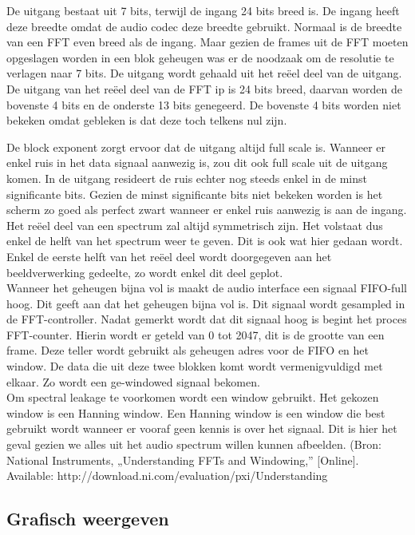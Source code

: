 \documentclass[a4paper,kul]{kulakarticle} %
\begin{document}
De uitgang bestaat uit 7 bits, terwijl de ingang 24 bits breed is. De ingang heeft deze breedte omdat de audio codec deze breedte gebruikt. Normaal is de breedte van een FFT even breed als de ingang. Maar gezien de frames uit de FFT moeten opgeslagen worden in een blok geheugen was er de noodzaak om de resolutie te verlagen naar 7 bits. De uitgang wordt gehaald uit het reëel deel van de uitgang. De uitgang van het reëel deel van de FFT ip is 24 bits breed, daarvan worden de bovenste 4 bits en de onderste 13 bits genegeerd. De bovenste 4 bits worden niet bekeken omdat gebleken is dat deze toch telkens nul zijn.

De block exponent zorgt ervoor dat de uitgang altijd full scale is. Wanneer er enkel ruis in het data signaal aanwezig is, zou dit ook full scale uit de uitgang komen.  In de uitgang resideert de ruis echter nog steeds enkel in de minst significante bits. Gezien de minst significante bits niet bekeken worden is het scherm zo goed als perfect zwart wanneer er enkel ruis aanwezig is aan de ingang.
Het reëel deel van een spectrum zal altijd symmetrisch zijn. Het volstaat dus enkel de helft van het spectrum weer te geven. Dit is ook wat hier gedaan wordt. Enkel de eerste helft van het reëel deel wordt doorgegeven aan het beeldverwerking gedeelte, zo wordt enkel dit deel geplot.\\

Wanneer het geheugen bijna vol is maakt de audio interface een signaal FIFO-full hoog. Dit geeft aan dat het geheugen bijna vol is. Dit signaal wordt gesampled in de FFT-controller. Nadat gemerkt wordt dat dit signaal hoog is begint het proces FFT-counter. Hierin wordt er geteld van 0 tot 2047, dit is de grootte van een frame. Deze teller wordt gebruikt als geheugen adres voor de FIFO en het window. De data die uit deze twee blokken komt wordt vermenigvuldigd met elkaar. Zo wordt een ge-windowed signaal bekomen.\\

Om spectral leakage te voorkomen wordt een window gebruikt. Het gekozen window is een Hanning window. Een Hanning window is een window die best gebruikt wordt wanneer er vooraf geen kennis is over het signaal. Dit is hier het geval gezien we alles uit het audio spectrum willen kunnen afbeelden.
(Bron: National Instruments, „Understanding FFTs and Windowing,” [Online]. Available: http://download.ni.com/evaluation/pxi/Understanding%


\subsection{Grafisch weergeven}
\end{document}
